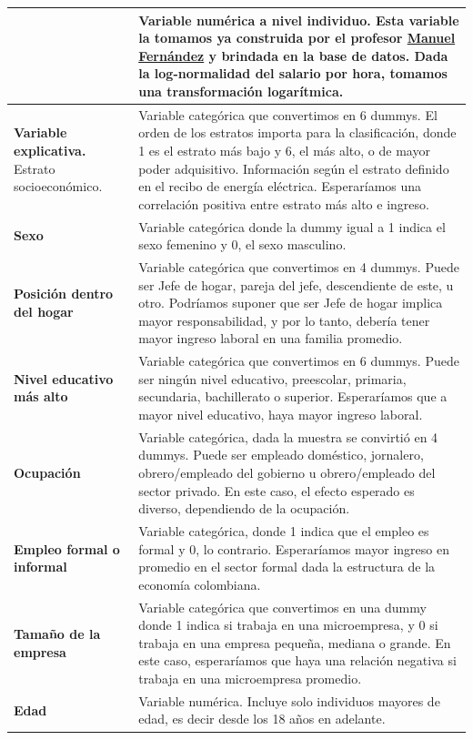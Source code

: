 \begin{longtable}{|>{\raggedright\arraybackslash}p{.35\linewidth}|p{.65\linewidth}|}
    & Variable numérica a nivel individuo. Esta variable la tomamos ya construida por el profesor \href{https://man-fern.github.io/}{Manuel Fernández} y brindada en la base de datos. Dada la log-normalidad del salario por hora, tomamos una transformación logarítmica. \\
    \hline
    \textbf{Variable explicativa.} Estrato socioeconómico.  
    & Variable categórica que convertimos en 6 dummys. El orden de los estratos importa para la clasificación, donde 1 es el estrato más bajo y 6, el más alto, o de mayor poder adquisitivo.
    Información según el estrato definido en el recibo de energía eléctrica.  Esperaríamos una correlación positiva entre estrato más alto e ingreso.  \\
    \hline
    \textbf{Sexo} 
    & Variable categórica donde la dummy igual a 1 indica el sexo femenino y 0, el sexo masculino.   \\
    \hline
    \textbf{Posición dentro del hogar} 
    & Variable categórica que convertimos en 4 dummys. Puede ser Jefe de hogar, pareja del jefe, descendiente de este, u otro. Podríamos suponer que ser Jefe de hogar implica mayor responsabilidad, y por lo tanto, debería tener mayor ingreso laboral en una familia promedio. \\
    \hline
    \textbf{ Nivel educativo más alto}
    & Variable categórica que convertimos en 6 dummys. Puede ser ningún nivel educativo, preescolar, primaria, secundaria, bachillerato o superior. Esperaríamos que a mayor nivel educativo, haya mayor ingreso laboral.  \\
    \hline    
    \textbf{Ocupación} 
    & Variable categórica, dada la muestra se convirtió en 4 dummys. Puede ser empleado doméstico, jornalero, obrero/empleado del gobierno u obrero/empleado del sector privado. En este caso, el efecto esperado es diverso, dependiendo de la ocupación. \\
    \hline
    \textbf{Empleo formal o informal}  
    & Variable categórica, donde 1 indica que el empleo es formal y 0, lo contrario. Esperaríamos mayor ingreso en promedio en el sector formal dada la estructura de la economía colombiana.   \\
    \hline
    \textbf{Tamaño de la empresa} 
    & Variable categórica que convertimos en una dummy donde 1 indica si trabaja en una microempresa, y 0 si trabaja en una empresa pequeña, mediana o grande. En este caso, esperaríamos que haya una relación negativa si trabaja en una microempresa promedio.   \\
    \hline
    \textbf{Edad} 
    & Variable numérica. Incluye solo individuos mayores de edad, es decir desde los 18 años en adelante.    \\
    \hline
\end{longtable}
    
